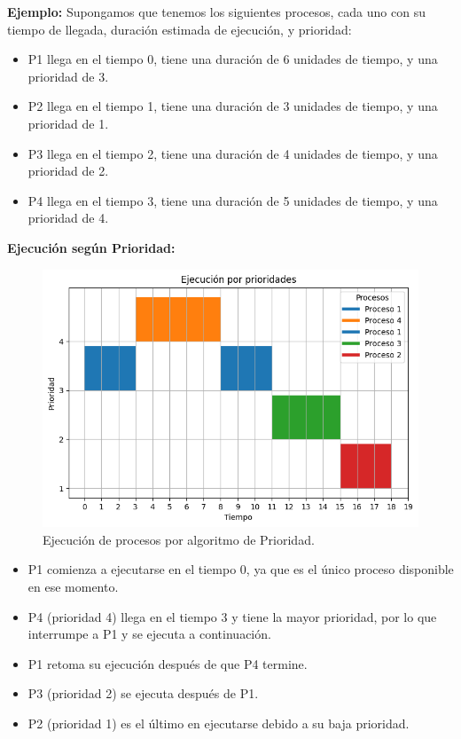 \textbf{Ejemplo:} Supongamos que tenemos los siguientes procesos, cada uno con su tiempo de llegada, duración estimada de ejecución, y prioridad:

\begin{itemize} 
	\item P1 llega en el tiempo 0, tiene una duración de 6 unidades de tiempo, y una prioridad de 3.
	\item P2 llega en el tiempo 1, tiene una duración de 3 unidades de tiempo, y una prioridad de 1. 
	\item P3 llega en el tiempo 2, tiene una duración de 4 unidades de tiempo, y una prioridad de 2.
	\item P4 llega en el tiempo 3, tiene una duración de 5 unidades de tiempo, y una prioridad de 4.
\end{itemize}

\textbf{Ejecución según Prioridad:}

\begin{figure}[H] \centering \includegraphics[width=0.8\linewidth]{Imagenes/prioridades.png}
	\caption{Ejecución de procesos por algoritmo de Prioridad.} 
\end{figure}

\begin{itemize}
	\item P1 comienza a ejecutarse en el tiempo 0, ya que es el único proceso disponible en ese momento.
	\item P4 (prioridad 4) llega en el tiempo 3 y tiene la mayor prioridad, por lo que interrumpe a P1 y se ejecuta a continuación.
	\item P1 retoma su ejecución después de que P4 termine.
	\item P3 (prioridad 2) se ejecuta después de P1.
	\item P2 (prioridad 1) es el último en ejecutarse debido a su baja prioridad.
\end{itemize}
